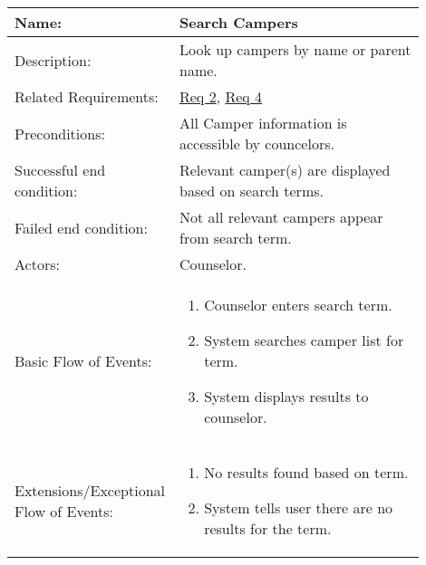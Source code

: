\documentclass[11pt]{article}
\begin{document}
\begin{table}[!htb]
\begin{center}
\begin{tabular}{p{0.30\linewidth}p{0.60\linewidth}}
	Name: & Search Campers \\\hline
	Description: & Look up campers by name or parent name. \\\hline
	Related Requirements:& \hyperlink{Req2}{Req 2}, \hyperlink{Req4}{Req 4}\\\hline
	Preconditions:& All Camper information is accessible by councelors.\\\hline
	Successful end condition:& Relevant camper(s) are displayed based on search terms.\\\hline
	Failed end condition:& Not all relevant campers appear from search term.\\\hline
	Actors:& Counselor.\\\hline
	Basic Flow of Events: & \begin{enumerate}[topsep=0pt]
		\item Counselor enters search term.
		\item System searches camper list for term.
		\item System displays results to counselor.
	\end{enumerate}\\\hline
	Extensions/Exceptional Flow of Events: & \begin{enumerate}[topsep=0pt]
		\item No results found based on term.
		\item System tells user there are no results for the term.	
	\end{enumerate}
\end{tabular}
\label{des:search campers}	
\end{center}
\end{table}
\end{document}
